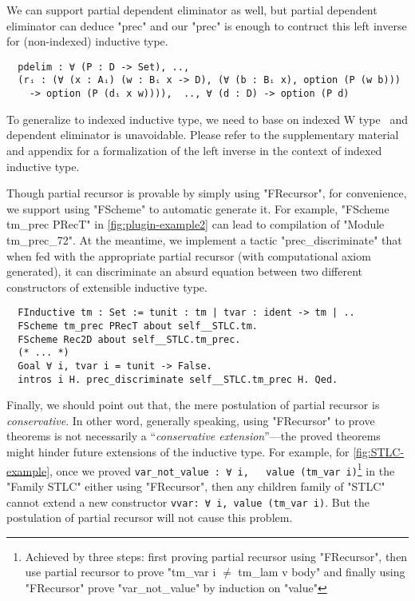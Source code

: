 We can support partial dependent eliminator as well, but partial dependent eliminator can deduce "prec" and our "prec" is enough to contruct this left inverse for (non-indexed) inductive type. 
\begin{verbatim}
  pdelim : ∀ (P : D -> Set), .., 
  (rᵢ : (∀ (x : Aᵢ) (w : Bᵢ x -> D), (∀ (b : Bᵢ x), option (P (w b))) 
    -> option (P (dᵢ x w)))),  .., ∀ (d : D) -> option (P d)
\end{verbatim}
To generalize to indexed inductive type, we need to base on indexed W type~\cite{martin1982constructive, morris2009indexed,jashug2017} and dependent eliminator is unavoidable. Please refer to the supplementary material and appendix for a formalization of the left inverse in the context of indexed inductive type. 

Though partial recursor is provable by simply using "FRecursor", for convenience, we support using "FScheme" to automatic generate it. For example, "FScheme tm_prec PRecT" in \cref{fig:plugin-example2} can lead to compilation of "Module tm_prec_72". At the meantime, we implement a tactic "prec_discriminate" that when fed with the appropriate partial recursor (with computational axiom generated), it can discriminate an absurd equation between two different constructors of extensible inductive type.
\begin{verbatim}
  FInductive tm : Set := tunit : tm | tvar : ident -> tm | ..
  FScheme tm_prec PRecT about self__STLC.tm.
  FScheme Rec2D about self__STLC.tm_prec.
  (* ... *)
  Goal ∀ i, tvar i = tunit -> False.
  intros i H. prec_discriminate self__STLC.tm_prec H. Qed.
\end{verbatim}


Finally, we should point out that, the mere postulation of partial recursor is \textit{conservative}. In other word, generally speaking, using "FRecursor" to prove theorems is not necessarily a ``\textit{conservative extension}''---the proved theorems might hinder future extensions of the inductive type. For example, for \cref{fig:STLC-example}, once we proved \texttt{var_not_value : ∀ i, ~ value (tm_var i)}\footnote{Achieved by three steps: first proving partial recursor using "FRecursor", then use partial recursor to prove "tm_var i $\neq$ tm_lam v body" and finally using "FRecursor" prove "var_not_value" by induction on "value"} in the "Family STLC" either using "FRecursor", then any children family of "STLC" cannot extend a new constructor \texttt{vvar: ∀ i, value (tm_var i)}. But the postulation of partial recursor will not cause this problem.


